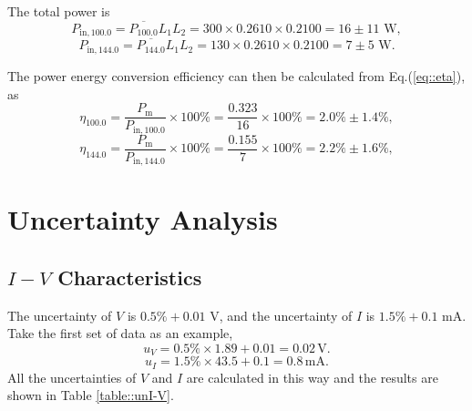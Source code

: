 \documentclass[a4paper]{article}
\begin{document}
The total power is
$$P_{\text{in},100.0} = \overline{P_{100.0}}L_1L_2 = 300 \times 0.2610 \times 0.2100 = 16 \pm 11\,\,\text{W},$$
$$P_{\text{in},144.0} = \overline{P_{144.0}}L_1L_2 = 130 \times 0.2610 \times 0.2100 = 7 \pm 5\,\,\text{W}.$$

The power energy conversion efficiency can then be calculated from Eq.(\ref{eq::eta}), as
$$\eta_{100.0} = \frac{P_\text{m}}{P_{\text{in},100.0}} \times 100\% = \frac{0.323}{16} \times 100\%= 2.0\% \pm 1.4\%,$$
$$\eta_{144.0} = \frac{P_\text{m}}{P_{\text{in},144.0}} \times 100\% = \frac{0.155}{7} \times 100\%= 2.2\% \pm 1.6\%,$$



\section{Uncertainty Analysis}

\subsection{$I-V$ Characteristics}

The uncertainty of $V$ is $0.5\%+0.01$ V, and the uncertainty of $I$ is $1.5\%+0.1$ mA. Take the first set of data as an example,
$$u_{V} = 0.5\% \times 1.89 + 0.01 = 0.02\,\text{V}.$$
$$u_{I} = 1.5\% \times 43.5 + 0.1 = 0.8\,\text{mA}.$$
All the uncertainties of $V$ and $I$ are calculated in this way and the results are shown in Table \ref{table::unI-V}.
\end{document}
